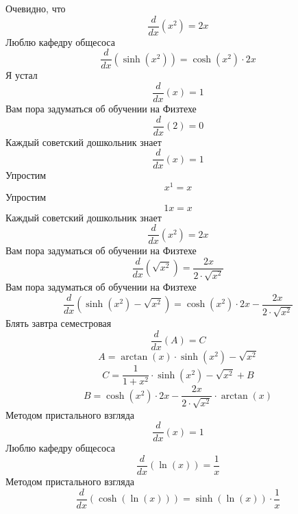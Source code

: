 \documentclass[12pt, a4paper]{article}
\begin{document}
Очевидно, что
\begin{equation}
\frac{d}{dx}({x}^{2}) = 2x
\end{equation}
Люблю кафедру общесоса
\begin{equation}
\frac{d}{dx}(\sinh({x}^{2})) = \cosh({x}^{2}) \cdot 2x
\end{equation}
Я устал
\begin{equation}
\frac{d}{dx}(x) = 1
\end{equation}
Вам пора задуматься об обучении на Физтехе
\begin{equation}
\frac{d}{dx}(2) = 0
\end{equation}
Каждый советский дошкольник знает
\begin{equation}
\frac{d}{dx}(x) = 1
\end{equation}
Упростим
\begin{equation}
{x}^{1} = x
\end{equation}
Упростим
\begin{equation}
1x = x
\end{equation}
Каждый советский дошкольник знает
\begin{equation}
\frac{d}{dx}({x}^{2}) = 2x
\end{equation}
Вам пора задуматься об обучении на Физтехе
\begin{equation}
\frac{d}{dx}(\sqrt{{x}^{2}}) = \frac{2x}{2 \cdot \sqrt{{x}^{2}}}
\end{equation}
Вам пора задуматься об обучении на Физтехе
\begin{equation}
\frac{d}{dx}(\sinh({x}^{2})-\sqrt{{x}^{2}}) = \cosh({x}^{2}) \cdot 2x-\frac{2x}{2 \cdot \sqrt{{x}^{2}}}
\end{equation}
Блять завтра семестровая
\begin{equation}
\frac{d}{dx}(A) = C
\end{equation}
$$A = \arctan(x) \cdot \sinh({x}^{2})-\sqrt{{x}^{2}}$$
$$C = \frac{1}{1+{x}^{2}} \cdot \sinh({x}^{2})-\sqrt{{x}^{2}}+B$$
$$B = \cosh({x}^{2}) \cdot 2x-\frac{2x}{2 \cdot \sqrt{{x}^{2}}} \cdot \arctan(x)$$
Методом пристального взгляда
\begin{equation}
\frac{d}{dx}(x) = 1
\end{equation}
Люблю кафедру общесоса
\begin{equation}
\frac{d}{dx}(\ln(x)) = \frac{1}{x}
\end{equation}
Методом пристального взгляда
\begin{equation}
\frac{d}{dx}(\cosh(\ln(x))) = \sinh(\ln(x)) \cdot \frac{1}{x}
\end{equation}
\end{document}
